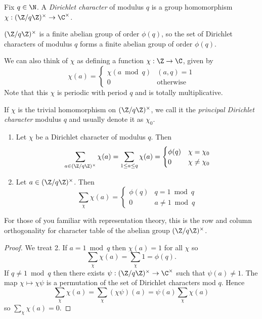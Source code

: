 \documentclass[a4paper]{article}
\theoremstyle{definition}
\begin{document}
\begin{definition}
  Fix \(q \in \N\). A \emph{Dirichlet character} of modulus \(q\) is a group homomorphism \(\chi: (\Z/q\Z)^\times \to \C^\times\).
\end{definition}

\((\Z/q\Z)^\times\) is a finite abelian group of order \(\phi(q)\), so the set of Dirichlet characters of modulus \(q\) forms a finite abelian group of order \(\phi(q)\).

We can also think of \(\chi\) as defining a function \(\chi: \Z \to \C\), given by
\[
  \chi(a) =
  \begin{cases}
    \chi(a \bmod q) & (a, q) = 1 \\
    0 & \text{otherwise}
  \end{cases}
\]
Note that this \(\chi\) is periodic with period \(q\) and is totally multiplicative.

If \(\chi\) is the trivial homomorphism on \((\Z/q\Z)^\times\), we call it the \emph{principal Dirichlet character} modulus \(q\) and usually denote it as \(\chi_0\).

\begin{lemma}\leavevmode
  \begin{enumerate}
  \item Let \(\chi\) be a Dirichlet character of modulus \(q\). Then
    \[
      \sum_{a \in (\Z/q\Z)^\times} \chi(a)
      = \sum_{1 \leq a \leq q} \chi(a)
      =
      \begin{cases}
        \phi(q) & \chi = \chi_0 \\
        0 & \chi \neq \chi_0
      \end{cases}
    \]
  \item Let \(a \in (\Z/q\Z)^\times\). Then
    \[
      \sum_\chi \chi(a) =
      \begin{cases}
        \phi(q) & q = 1 \bmod q \\
        0 & a \neq 1 \bmod q
      \end{cases}
    \]
  \end{enumerate}
\end{lemma}
For those of you familiar with representation theory, this is the row and column orthogonality for character table of the abelian group \((\Z/q\Z)^\times\).

\begin{proof}
  We treat 2. If \(a = 1 \bmod q\) then \(\chi(a) = 1\) for all \(\chi\) so
  \[
    \sum_\chi \chi(a) = \sum_\chi 1 = \phi(q).
  \]
  If \(q \neq 1 \bmod q\) then there exists \(\psi: (\Z/q\Z)^\times \to \C^\times\) such that \(\psi(a) \neq 1\). The map \(\chi \mapsto \chi \psi\) is a permutation of the set of Dirichlet characters mod \(q\). Hence
  \[
    \sum_\chi \chi(a)
    = \sum_\chi (\chi \psi) (a)
    = \psi(a) \sum_\chi \chi(a)
  \]
  so \(\sum_\chi \chi(a) = 0\).
\end{proof}
\end{document}
